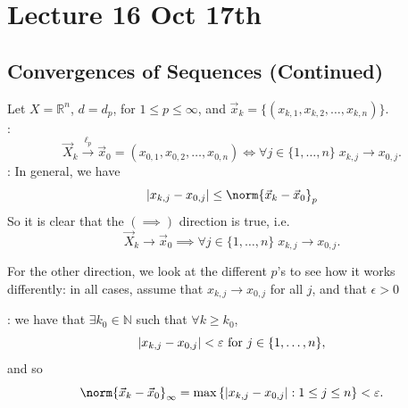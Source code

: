 \documentclass[notoc,notitlepage]{tufte-book}
\begin{document}


\chapter{Lecture 16 Oct 17th}%
\label{chp:lecture_16_oct_17th}

\section{Convergences of Sequences (Continued)}%
\label{sec:convergences_of_sequences_continued}

\begin{eg}
  Let $X = \mathbb{R}^n$, $d = d_p$, for $1 \leq p \leq \infty$, and $\vec{x}_k = \{ ( x_{k, 1}, x_{k, 2}, \ldots, x_{k, n} ) \}$.\\
  \noindent{}:
  \begin{equation*}
    \vec{X}_k \overset{\ell_p}{\to} \vec{x}_0 = (x_{0, 1}, x_{0, 2}, \ldots, x_{0, n}) \iff \forall j \in \{ 1, \ldots, n \} \; x_{k, j} \to x_{0, j}.
  \end{equation*}
  : In general, we have
  \begin{equation*}
    \abs{x_{k, j} - x_{0, j}} \leq \norm{\vec{x}_k - \vec{x}_0}_p
  \end{equation*}
  So it is clear that the $(\implies)$ direction is true, i.e.
  \begin{equation*}
    \vec{X}_k \to \vec{x}_0 \implies \forall j \in \{ 1, \ldots, n \} \; x_{k, j} \to x_{0, j}.
  \end{equation*}

  For the other direction, we look at the different $p$'s to see how it works differently: in all cases, assume that $x_{k, j} \to x_{0, j}$ for all $j$, and that $\epsilon > 0$

  \noindent{} : we have that $\exists k_0 \in \mathbb{N}$ such that $\forall k \geq k_0$,
  \begin{equation*}
    \left|x_{k, j} - x_{0, j}\right| < \varepsilon \text{ for } j \in \{ 1, \ldots, n \},
  \end{equation*}
  and so
  \begin{equation*}
    \norm{\vec{x}_k - \vec{x}_0}_\infty = \max \left\{ \abs{ x_{k, j} - x_{0, j} } : 1 \leq j \leq n \right\} < \epsilon.
  \end{equation*}


\end{eg}
\end{document}
